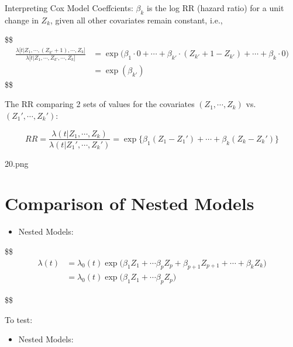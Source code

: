 \documentclass[
]{book}
\providecommand{\tightlist}{%
  \setlength{\itemsep}{0pt}\setlength{\parskip}{0pt}}
\theoremstyle{definition}
\theoremstyle{definition}
\theoremstyle{definition}
\theoremstyle{definition}
\theoremstyle{remark}
\begin{document}
Interpreting Cox Model Coeffcients: \(\beta_k\) is the log RR (hazard ratio) for a unit change in \(Z_k\), given all other covariates remain constant, i.e.,

\$\$
\begin{align}


\frac
{\lambda\Big[t \Big | Z_1 , \cdots, (Z_{k'}+1), \cdots, Z_k \Big]}
{\lambda\Big[t \Big | Z_1 , \cdots, Z_{k'}, \cdots, Z_k \Big]} 


&= \exp \Big (\beta_1 \cdot 0 + \cdots + \beta_{k'} \cdot (Z_{k'} +1 - Z_{k'}) + \cdots + \beta_k \cdot 0 \Big)

\\

&= \exp(\beta_{k'})


\end{align}
\$\$

The RR comparing 2 sets of values for the covariates \((Z_1 , \cdots, Z_k)\) vs.~\((Z_1' , \cdots, Z_k')\):

\[
RR = \frac{\lambda(t \Big | Z_1 , \cdots, Z_k)}{\lambda(t \Big | Z_1 ', \cdots, Z_k')} =\exp \Big \{ \beta_1(Z_1 - Z_1') + \cdots + \beta_k(Z_k - Z_k') \Big \}
\]

20.png

\hypertarget{comparison-of-nested-models}{%
\section{Comparison of Nested Models}\label{comparison-of-nested-models}}

\begin{itemize}
\tightlist
\item
  Nested Models:
\end{itemize}

\$\$
\begin{align}

\lambda(t) &= \lambda_0(t) \exp \Big ( \beta_1 Z_1 + \cdots \beta_p Z_p + \beta_{p+1} Z_{p+1} +\cdots + \beta_{k} Z_{k}\Big) \tag{Full Model}

\\

&= \lambda_0(t) \exp \Big ( \beta_1 Z_1 + \cdots \beta_p Z_p \Big) \tag{Reduced Model}


\end{align}

\$\$

To test:

\begin{itemize}
\tightlist
\item
  Nested Models:
\end{itemize}
\end{document}
